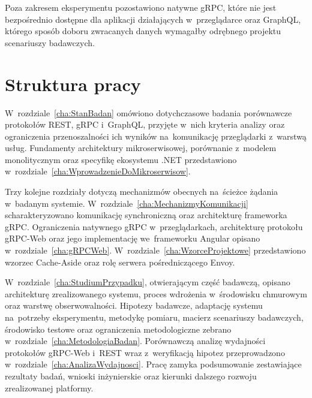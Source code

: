 Poza zakresem eksperymentu pozostawiono natywne gRPC, które nie jest
bezpośrednio dostępne dla aplikacji działających w~przeglądarce oraz
GraphQL, którego sposób doboru zwracanych danych wymagałby odrębnego
projektu scenariuszy badawczych.

\section{Struktura pracy}
\label{sec:StrukturaPracy}

W~rozdziale~\ref{cha:StanBadan} omówiono dotychczasowe badania porównawcze protokołów REST, gRPC i~GraphQL, przyjęte w~nich kryteria analizy oraz ograniczenia przenoszalności ich wyników na~komunikację przeglądarki z~warstwą usług. Fundamenty architektury mikroserwisowej, porównanie z~modelem monolitycznym oraz specyfikę ekosystemu .NET przedstawiono w~rozdziale~\ref{cha:WprowadzenieDoMikroserwisow}.

Trzy kolejne rozdziały dotyczą mechanizmów obecnych na~ścieżce żądania w~badanym systemie. W~rozdziale~\ref{cha:MechanizmyKomunikacji} scharakteryzowano komunikację synchroniczną oraz architekturę frameworka gRPC. Ograniczenia natywnego gRPC w~przeglądarkach, architekturę protokołu gRPC-Web oraz jego implementację we~frameworku Angular opisano w~rozdziale~\ref{cha:gRPCWeb}. W~rozdziale~\ref{cha:WzorceProjektowe} przedstawiono wzorzec Cache-Aside oraz rolę serwera pośredniczącego Envoy.

W~rozdziale~\ref{cha:StudiumPrzypadku}, otwierającym część badawczą, opisano architekturę zrealizowanego systemu, proces wdrożenia w~środowisku chmurowym oraz warstwę obserwowalności. Hipotezy badawcze, adaptację systemu na~potrzeby eksperymentu, metodykę pomiaru, macierz scenariuszy badawczych, środowisko testowe oraz ograniczenia metodologiczne zebrano w~rozdziale~\ref{cha:MetodologiaBadan}. Porównawczą analizę wydajności protokołów gRPC-Web i~REST wraz z~weryfikacją hipotez przeprowadzono w~rozdziale~\ref{cha:AnalizaWydajnosci}. Pracę zamyka podsumowanie zestawiające rezultaty badań, wnioski inżynierskie oraz kierunki dalszego rozwoju zrealizowanej platformy.
